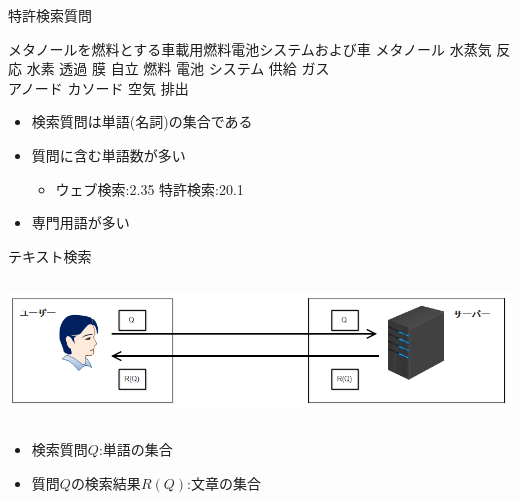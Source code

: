 \documentclass[14pt,xcolor=dvipsnames,table,dvipdfmx]{beamer}
\begin{document}
\begin{frame}{特許検索質問}
	\fontsize{10pt}{7.2}\selectfont
	\begin{exampleblock}{メタノールを燃料とする車載用燃料電池システムおよび車}
	メタノール 水蒸気 反応 水素 透過 膜 自立 燃料 電池 システム 供給 ガス \\ アノード カソード 空気 排出
	\end{exampleblock}
	\fontsize{14pt}{7.2}\selectfont
	\begin{block}{}
    \begin{itemize}
        \item 検索質問は単語(名詞)の集合である
        \item 質問に含む単語数が多い
		\begin{itemize}
			\item ウェブ検索:2.35 特許検索:20.1
		\end{itemize}
		\item 専門用語が多い
    \end{itemize}
	\end{block}
\end{frame}

\begin{frame}{テキスト検索}
\begin{columns}[t]
    \begin{column}{0.8\textwidth} %
        \includegraphics[width=\columnwidth]{photo1.png}
    \end{column}
\end{columns}
    \begin{block}{}
    \begin{itemize}
        \item 検索質問$Q$:単語の集合
        \item 質問$Q$の検索結果$R(Q)$:文章の集合
    \end{itemize}
    \end{block}
\end{frame}
\end{document}
